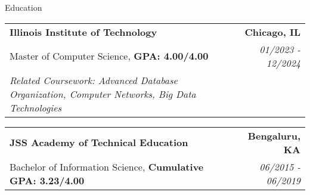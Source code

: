\documentclass{resume} %
\begin{document}
\vspace{-10pt} %
\begin{rSection}{Education}
   \begin{tabularx}{\textwidth}{@{}X r}
   \textbf{Illinois Institute of Technology} & \textbf{Chicago, IL} \\
   \small Master of Computer Science, \textbf{GPA: 4.00/4.00} & \small \textit{01/2023 - 12/2024} \\
   \small \textit{Related Coursework: Advanced Database Organization, Computer Networks, Big Data Technologies}
   \end{tabularx}
   
   \vspace{-3pt}

   \begin{tabularx}{\textwidth}{@{}X r}
   \textbf{JSS Academy of Technical Education} & \textbf{Bengaluru, KA} \\
   \small Bachelor of Information Science, \textbf{Cumulative GPA: 3.23/4.00} & \small \textit{06/2015 - 06/2019} \\
   \end{tabularx}
\end{rSection}
\end{document}
